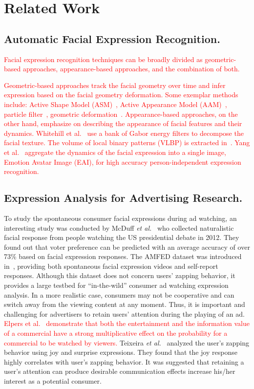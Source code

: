 \documentclass[twoside,leqno,twocolumn]{article}
\newcommand{\Songfan}[1]{\textcolor{red}{#1}}
\begin{document}
\section{Related Work}

\subsection{Automatic Facial Expression Recognition.}

\Songfan{Facial expression recognition techniques can be broadly divided as geometric-based approaches, appearance-based approaches, and the combination of both.}

\Songfan{Geometric-based approaches track the facial geometry over time and infer expression based on the facial geometry deformation. Some exemplar methods include: Active Shape Model (ASM)~\cite{Hu04}, Active Appearance Model (AAM)~\cite{Lucey06}, particle filter~\cite{Valstar05}, geometric deformation~\cite{Kotsia07}. Appearance-based approaches, on the other hand, emphasize on describing the appearance of facial features and their dynamics. Whitehill et al.~\cite{Whitehill09} use a bank of Gabor energy filters to decompose the facial texture. The volume of local binary patterns (VLBP) is extracted in~\cite{Zhao07}. Yang et al.~\cite{Yang12} aggregate the dynamics of the facial expression into a single image, Emotion Avatar Image (EAI), for high accuracy person-independent expression recognition.}

\subsection{Expression Analysis for Advertising Research.}

To study the spontaneous consumer facial expressions during ad watching, an interesting study was conducted by McDuff \textit{et al.}~\cite{McDuff13} who collected naturalistic facial response from people watching the US presidential debate in 2012. They found out that voter preference can be predicted with an average accuracy of over 73\% based on facial expression responses. The AMFED dataset was introduced in~\cite{amfed}, providing both spontaneous facial expression videos and self-report responses. Although this dataset does not concern users' zapping behavior, it provides a large testbed for ``in-the-wild'' consumer ad watching expression analysis. In a more realistic case, consumers may not be cooperative and can switch away from the viewing content at any moment. Thus, it is important and challenging for advertisers to retain users' attention during the playing of an ad. \Songfan{Elpers et al.~\cite{Elpers03} demonstrate that both the entertainment and the information value of a commercial have a strong multiplicative effect on the probability for a commercial to be watched by viewers.} Teixeira \textit{et al.}~\cite{Teixeira12} analyzed the user's zapping behavior using joy and surprise expressions. They found that the joy response highly correlates with user's zapping behavior. It was suggested that retaining a user's attention can produce desirable communication effects increase his/her interest as a potential consumer. 
\end{document}
